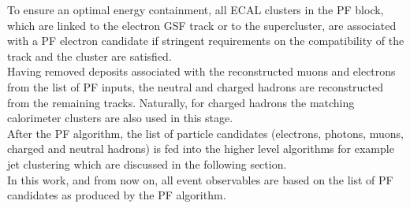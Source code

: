 To ensure an optimal energy containment, all ECAL clusters in the PF block, which are linked to the electron GSF track or to the supercluster, are associated with a PF electron candidate if stringent requirements on the compatibility of the track and the cluster are satisfied.\\
Having removed deposits associated with the reconstructed muons and electrons from the list of PF inputs, the neutral and charged hadrons are reconstructed from the remaining tracks. Naturally, for charged hadrons the matching calorimeter clusters are also used in this stage.\\
After the PF algorithm, the list of particle candidates (electrons, photons, muons, charged and neutral hadrons) is fed into the higher level algorithms for example jet clustering which are discussed in the following section.\\
In this work, and from now on, all event observables are based on the list of PF candidates as produced by the PF algorithm.
